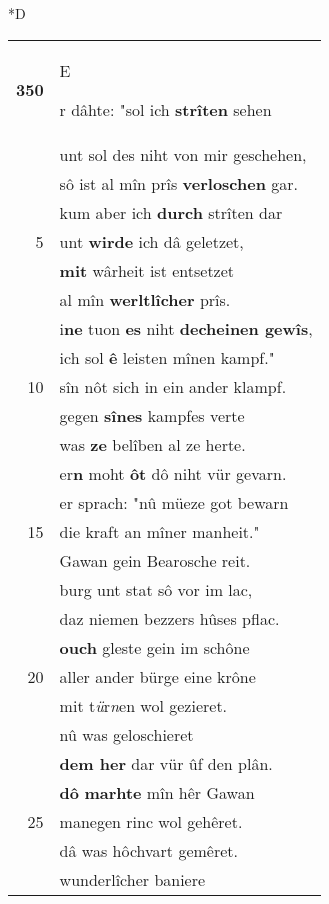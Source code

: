 \documentclass[8pt,a4paper,notitlepage]{article}
\begin{document}
\begin{table}[ht]
\begin{minipage}[t]{0.5\linewidth}
\small
\begin{center}*D
\end{center}
\begin{tabular}{rl}
\textbf{350} & \begin{large}E\end{large}r dâhte: "sol ich \textbf{strîten} sehen\\ 
 & unt sol des niht von mir geschehen,\\ 
 & sô ist al mîn prîs \textbf{verloschen} gar.\\ 
 & kum aber ich \textbf{durch} strîten dar\\ 
5 & unt \textbf{wirde} ich dâ geletzet,\\ 
 & \textbf{mit} wârheit ist entsetzet\\ 
 & al mîn \textbf{werltlîcher} prîs.\\ 
 & i\textbf{ne} tuon \textbf{es} niht \textbf{decheinen gewîs},\\ 
 & ich sol \textbf{ê} leisten mînen kampf."\\ 
10 & sîn nôt sich in ein ander klampf.\\ 
 & gegen \textbf{sînes} kampfes verte\\ 
 & was \textbf{ze} belîben al ze herte.\\ 
 & er\textbf{n} moht \textbf{ôt} dô niht vür gevarn.\\ 
 & er sprach: "nû müeze got bewarn\\ 
15 & die kraft an mîner manheit."\\ 
 & Gawan gein Bearosche reit.\\ 
 & burg unt stat sô vor im lac,\\ 
 & daz niemen bezzers hûses pflac.\\ 
 & \textbf{ouch} gleste gein im schône\\ 
20 & aller ander bürge eine krône\\ 
 & mit t\textit{ü}r\textit{n}en wol gezieret.\\ 
 & nû was geloschieret\\ 
 & \textbf{dem her} dar vür ûf den plân.\\ 
 & \textbf{dô} \textbf{marhte} mîn hêr Gawan\\ 
25 & manegen rinc wol gehêret.\\ 
 & dâ was hôchvart gemêret.\\ 
 & wunderlîcher baniere\\ 

\end{tabular}
\end{minipage}
\end{table}
\end{document}

